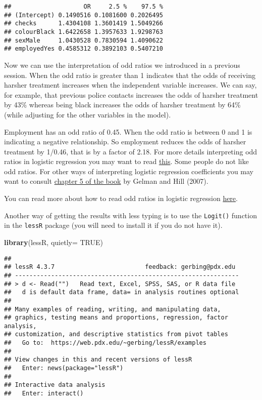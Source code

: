 \documentclass[
]{book}
\newenvironment{Shaded}{\begin{snugshade}}{\end{snugshade}}
\newcommand{\AttributeTok}[1]{\textcolor[rgb]{0.13,0.29,0.53}{#1}}
\newcommand{\ConstantTok}[1]{\textcolor[rgb]{0.56,0.35,0.01}{#1}}
\newcommand{\FunctionTok}[1]{\textcolor[rgb]{0.13,0.29,0.53}{\textbf{#1}}}
\newcommand{\NormalTok}[1]{#1}
\begin{document}
\begin{verbatim}
##                    OR     2.5 %    97.5 %
## (Intercept) 0.1490516 0.1081600 0.2026495
## checks      1.4304108 1.3601419 1.5049266
## colourBlack 1.6422658 1.3957633 1.9298763
## sexMale     1.0430528 0.7830594 1.4090622
## employedYes 0.4585312 0.3892103 0.5407210
\end{verbatim}

Now we can use the interpretation of odd ratios we introduced in a previous session. When the odd ratio is greater than 1 indicates that the odds of receiving harsher treatment increases when the independent variable increases. We can say, for example, that previous police contacts increases the odds of harsher treatment by 43\% whereas being black increases the odds of harsher treatment by 64\% (while adjusting for the other variables in the model).

Employment has an odd ratio of 0.45. When the odd ratio is between 0 and 1 is indicating a negative relationship. So employment reduces the odds of harsher treatment by 1/0.46, that is by a factor of 2.18. For more details interpreting odd ratios in logistic regression you may want to read \href{http://www.ats.ucla.edu/stat/mult_pkg/faq/general/odds_ratio.htm}{this}. Some people do not like odd ratios. For other ways of interpreting logistic regression coefficients you may want to consult \href{http://www.cambridge.org/gb/academic/subjects/statistics-probability/statistical-theory-and-methods/data-analysis-using-regression-and-multilevelhierarchical-models?format=PB}{chapter 5 of the book} by Gelman and Hill (2007).

You can read more about how to read odd ratios in logistic regression \href{https://stats.idre.ucla.edu/other/mult-pkg/faq/general/faq-how-do-i-interpret-odds-ratios-in-logistic-regression/}{here}.

Another way of getting the results with less typing is to use the \texttt{Logit()} function in the \texttt{lessR} package (you will need to install it if you do not have it).

\begin{Shaded}
\begin{Highlighting}[]
\FunctionTok{library}\NormalTok{(lessR, }\AttributeTok{quietly=} \ConstantTok{TRUE}\NormalTok{)}
\end{Highlighting}
\end{Shaded}

\begin{verbatim}
## 
## lessR 4.3.7                         feedback: gerbing@pdx.edu 
## --------------------------------------------------------------
## > d <- Read("")   Read text, Excel, SPSS, SAS, or R data file
##   d is default data frame, data= in analysis routines optional
## 
## Many examples of reading, writing, and manipulating data, 
## graphics, testing means and proportions, regression, factor analysis,
## customization, and descriptive statistics from pivot tables
##   Go to:  https://web.pdx.edu/~gerbing/lessR/examples
## 
## View changes in this and recent versions of lessR
##   Enter: news(package="lessR")
## 
## Interactive data analysis
##   Enter: interact()
\end{verbatim}
\end{document}
